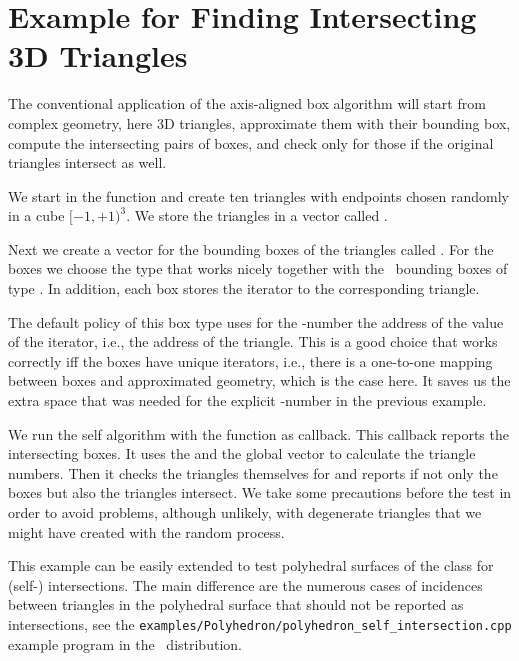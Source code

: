 

\section{Example for Finding Intersecting 3D Triangles}

The conventional application of the axis-aligned box 
algorithm will start from complex geometry, here 3D triangles,
approximate them with their bounding box, compute the intersecting
pairs of boxes, and check only for those if the original triangles
intersect as well.

We start in the  function and create ten triangles with
endpoints chosen randomly in a cube $[-1,+1)^3$. We store the
triangles in a vector called .

Next we create a vector for the bounding boxes of the triangles called
. For the boxes we choose the type
 that works nicely together
with the \cgal\ bounding boxes of type . In
addition, each box stores the iterator to the corresponding triangle.

The default policy of this box type uses for the -number the 
address of the value of the iterator, i.e., the address of the
triangle. This is a good choice that works correctly iff the boxes
have unique iterators, i.e., there is a one-to-one mapping between
boxes and approximated geometry, which is the case here. It saves us
the extra space that was needed for the explicit -number in
the previous example.

We run the self  algorithm with the 
function as callback. This callback reports the intersecting boxes. It
uses the  and the global  vector to
calculate the triangle numbers. Then it checks the triangles
themselves for  and reports if not only the boxes but also
the triangles intersect. We take some precautions before the
 test in order to avoid problems, although unlikely, with
degenerate triangles that we might have created with the random
process.

This example can be easily extended to test polyhedral surfaces of the
 class for (self-) intersections. The main
difference are the numerous cases of incidences between triangles in
the polyhedral surface that should not be reported as intersections,
see the \texttt{examples/Polyhedron/polyhedron\_self\_intersection.cpp}
example program in the \cgal\ distribution. 


